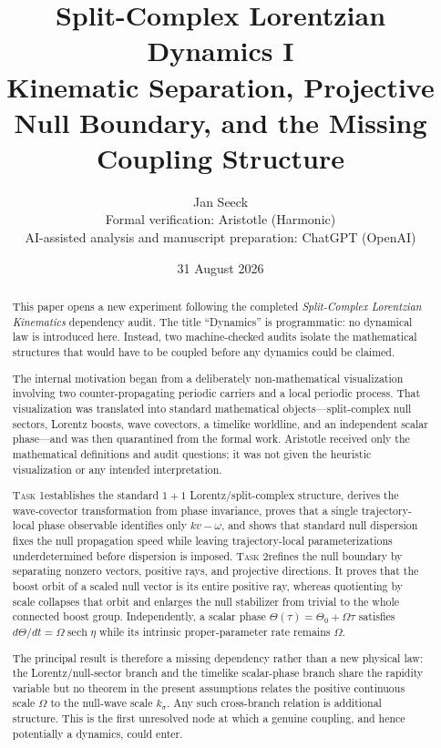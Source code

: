 \documentclass[11pt,a4paper]{article}
\title{\textbf{Split-Complex Lorentzian Dynamics I}\\[0.35em]
\large Kinematic Separation, Projective Null Boundary, and the Missing Coupling Structure}
\author{Jan Seeck\\
\small Formal verification: Aristotle (Harmonic)\\
\small AI-assisted analysis and manuscript preparation: ChatGPT (OpenAI)}
\date{31 August 2026}
\newcommand{\sech}{\operatorname{sech}}
\newcommand{\TaskOne}{\textsc{Task 1}}
\newcommand{\TaskTwo}{\textsc{Task 2}}
\begin{document}
\maketitle

\begin{abstract}
This paper opens a new experiment following the completed \emph{Split-Complex Lorentzian Kinematics} dependency audit.  The title ``Dynamics'' is programmatic: no dynamical law is introduced here.  Instead, two machine-checked audits isolate the mathematical structures that would have to be coupled before any dynamics could be claimed.

The internal motivation began from a deliberately non-mathematical visualization involving two counter-propagating periodic carriers and a local periodic process.  That visualization was translated into standard mathematical objects---split-complex null sectors, Lorentz boosts, wave covectors, a timelike worldline, and an independent scalar phase---and was then quarantined from the formal work.  Aristotle received only the mathematical definitions and audit questions; it was not given the heuristic visualization or any intended interpretation.

\TaskOne establishes the standard $1+1$ Lorentz/split-complex structure, derives the wave-covector transformation from phase invariance, proves that a single trajectory-local phase observable identifies only $kv-\omega$, and shows that standard null dispersion fixes the null propagation speed while leaving trajectory-local parameterizations underdetermined before dispersion is imposed.  \TaskTwo refines the null boundary by separating nonzero vectors, positive rays, and projective directions.  It proves that the boost orbit of a scaled null vector is its entire positive ray, whereas quotienting by scale collapses that orbit and enlarges the null stabilizer from trivial to the whole connected boost group.  Independently, a scalar phase $\Theta(\tau)=\Theta_0+\Omega\tau$ satisfies $d\Theta/dt=\Omega\sech\eta$ while its intrinsic proper-parameter rate remains $\Omega$.

The principal result is therefore a missing dependency rather than a new physical law: the Lorentz/null-sector branch and the timelike scalar-phase branch share the rapidity variable but no theorem in the present assumptions relates the positive continuous scale $\Omega$ to the null-wave scale $k_\sigma$.  Any such cross-branch relation is additional structure.  This is the first unresolved node at which a genuine coupling, and hence potentially a dynamics, could enter.
\end{abstract}
\end{document}
